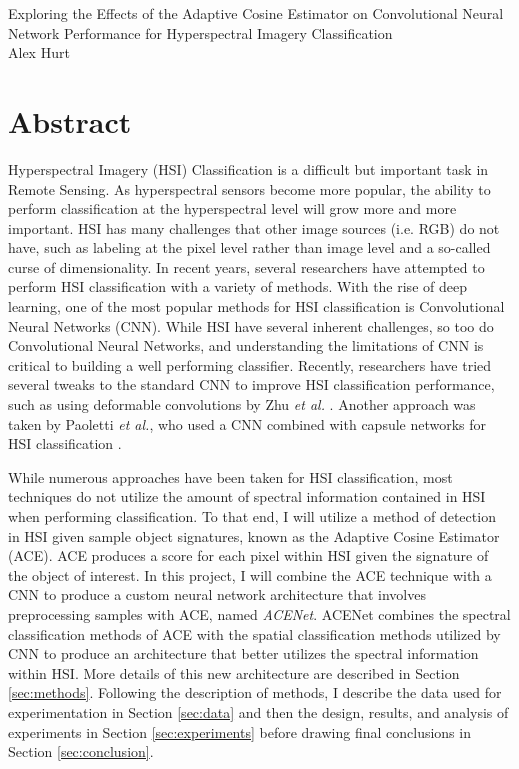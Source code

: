 \documentclass[12pt]{article}
\begin{document}
	
\begin{center}
	\huge{Exploring the Effects of the Adaptive Cosine Estimator on Convolutional Neural Network Performance for Hyperspectral Imagery Classification} \\
	\vspace{5mm}
	\large{Alex Hurt}
\end{center}

%
\section{Abstract}

Hyperspectral Imagery (HSI) Classification is a difficult but important task in Remote Sensing.
%
As hyperspectral sensors become more popular, the ability to perform classification at the hyperspectral level will grow more and more important.
%
HSI has many challenges that other image sources (i.e. RGB) do not have, such as labeling at the pixel level rather than image level and a so-called curse of dimensionality.
%
In recent years, several researchers have attempted to perform HSI classification with a variety of methods.
%
With the rise of deep learning, one of the most popular methods for HSI classification is Convolutional Neural Networks (CNN).
%
While HSI have several inherent challenges, so too do Convolutional Neural Networks, and understanding the limitations of CNN is critical to building a well performing classifier.
%
Recently, researchers have tried several tweaks to the standard CNN to improve HSI classification performance, such as using deformable convolutions by Zhu \textit{et al.} \cite{zhu_deformable_2018}. 
%
Another approach was taken by Paoletti \textit{et al.}, who used a CNN combined with capsule networks for HSI classification \cite{paoletti_capsule_2018}.

While numerous approaches have been taken for HSI classification, most techniques do not utilize the amount of spectral information contained in HSI when performing classification.
%
To that end, I will utilize a method of detection in HSI given sample object signatures, known as the Adaptive Cosine Estimator (ACE).
%
ACE produces a score for each pixel within HSI given the signature of the object of interest. 
%
In this project, I will combine the ACE technique with a CNN to produce a custom neural network architecture that involves preprocessing samples with ACE, named \textit{ACENet}.
%
ACENet combines the spectral classification methods of ACE with the spatial classification methods utilized by CNN to produce an architecture that better utilizes the spectral information within HSI.
%
More details of this new architecture are described in Section \ref{sec:methods}.
%
Following the description of methods, I describe the data used for experimentation in Section \ref{sec:data} and then the design, results, and analysis of experiments in Section \ref{sec:experiments} before drawing final conclusions in Section \ref{sec:conclusion}.
\end{document}

